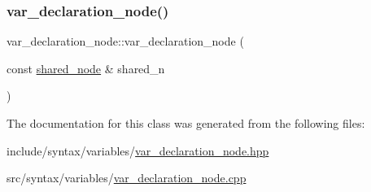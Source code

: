 \subsubsection{\texorpdfstring{var\+\_\+declaration\+\_\+node()}{var\_declaration\_node()}}
{\footnotesize\ttfamily var\+\_\+declaration\+\_\+node\+::var\+\_\+declaration\+\_\+node (\begin{DoxyParamCaption}\item[{const \hyperlink{namespacejawe_a3f307481d921b6cbb50cc8511fc2b544}{shared\+\_\+node} \&}]{shared\+\_\+n }\end{DoxyParamCaption})}



The documentation for this class was generated from the following files\+:\begin{DoxyCompactItemize}
\item 
include/syntax/variables/\hyperlink{var__declaration__node_8hpp}{var\+\_\+declaration\+\_\+node.\+hpp}\item 
src/syntax/variables/\hyperlink{var__declaration__node_8cpp}{var\+\_\+declaration\+\_\+node.\+cpp}\end{DoxyCompactItemize}
